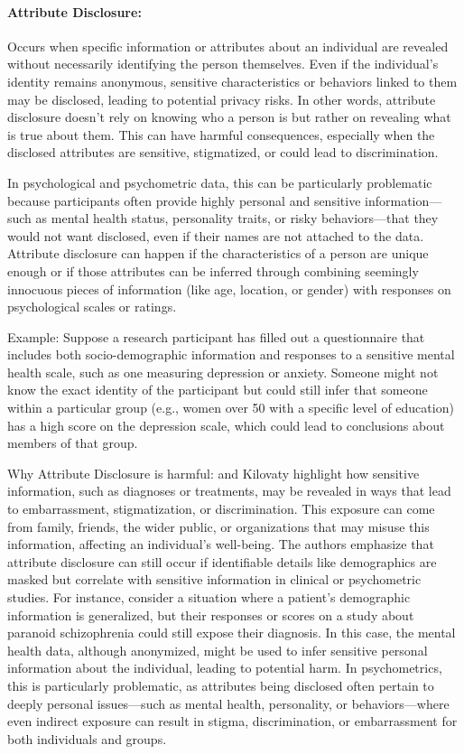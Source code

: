 \documentclass{article}
\begin{document}
\paragraph{Attribute Disclosure:} 
\color{blue}
Occurs when specific information or attributes about an individual are revealed without necessarily identifying the person themselves. Even if the individual’s identity remains anonymous, sensitive characteristics or behaviors linked to them may be disclosed, leading to potential privacy risks. In other words, attribute disclosure doesn’t rely on knowing who a person is but rather on revealing what is true about them. This can have harmful consequences, especially when the disclosed attributes are sensitive, stigmatized, or could lead to discrimination.

In psychological and psychometric data, this can be particularly problematic because participants often provide highly personal and sensitive information—such as mental health status, personality traits, or risky behaviors—that they would not want disclosed, even if their names are not attached to the data. Attribute disclosure can happen if the characteristics of a person are unique enough or if those attributes can be inferred through combining seemingly innocuous pieces of information (like age, location, or gender) with responses on psychological scales or ratings.

Example: 
Suppose a research participant has filled out a questionnaire that includes both socio-demographic information and responses to a sensitive mental health scale, such as one measuring depression or anxiety. Someone might not know the exact identity of the participant but could still infer that someone within a particular group (e.g., women over 50 with a specific level of education) has a high score on the depression scale, which could lead to conclusions about members of that group.

Why Attribute Disclosure is harmful:
\cite{2022_Wairimu} and Kilovaty \cite{2021_Kilovaty} highlight how sensitive information, such as diagnoses or treatments, may be revealed in ways that lead to embarrassment, stigmatization, or discrimination. This exposure can come from family, friends, the wider public, or organizations that may misuse this information, affecting an individual’s well-being. The authors emphasize that attribute disclosure can still occur if identifiable details like demographics are masked but correlate with sensitive information in clinical or psychometric studies.
For instance, consider a situation where a patient's demographic information is generalized, but their responses or scores on a study about paranoid schizophrenia could still expose their diagnosis. In this case, the mental health data, although anonymized, might be used to infer sensitive personal information about the individual, leading to potential harm. In psychometrics, this is particularly problematic, as attributes being disclosed often pertain to deeply personal issues—such as mental health, personality, or behaviors—where even indirect exposure can result in stigma, discrimination, or embarrassment for both individuals and groups.
\color{black}
\end{document}
